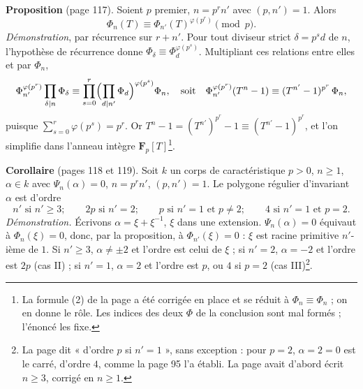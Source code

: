 \documentclass[11pt,a4paper]{article}
\begin{document}
\textbf{Proposition} (page 117). Soient $p$ premier, $n = p^r n'$ avec $(p,
n') = 1$. Alors
\[
  \Phi_n(T) \equiv \Phi_{n'}(T)^{\varphi(p^r)} \pmod p .
\]
\emph{Démonstration}, par récurrence sur $r + n'$. Pour tout diviseur strict
$\delta = p^s d$ de $n$, l'hypothèse de récurrence donne $\Phi_\delta \equiv
\Phi_d^{\varphi(p^s)}$. Multipliant ces relations entre elles et par
$\Phi_n$,
\[
  \Phi_{n'}^{\varphi(p^r)} \prod_{\delta \mid n} \Phi_\delta \equiv
  \prod_{s = 0}^{r} \Bigl(\prod_{d \mid n'} \Phi_d\Bigr)^{\varphi(p^s)}
  \Phi_n , \quad\text{soit}\quad
  \Phi_{n'}^{\varphi(p^r)} (T^n - 1) \equiv (T^{n'} - 1)^{p^r}\, \Phi_n ,
\]
puisque $\sum_{s=0}^{r} \varphi(p^s) = p^r$. Or $T^n - 1 = (T^{n'})^{p^r} -
1 \equiv (T^{n'} - 1)^{p^r}$, et l'on simplifie dans l'anneau intègre
$\mathbf{F}_p[T]$\footnote{La formule (2) de la page a été corrigée en place et
se réduit à $\Phi_n \equiv \Phi_n$ ; on en donne le rôle. Les indices des deux
$\Phi$ de la conclusion sont mal formés ; l'énoncé les fixe.}.

\textbf{Corollaire} (pages 118 et 119). Soit $k$ un corps de caractéristique
$p > 0$, $n \geq 1$, $\alpha \in k$ avec $\Psi_n(\alpha) = 0$, $n = p^r n'$,
$(p, n') = 1$. Le polygone régulier d'invariant $\alpha$ est d'ordre
\[
  n' \text{ si } n' \geq 3 ; \qquad 2p \text{ si } n' = 2 ; \qquad p \text{ si
  } n' = 1 \text{ et } p \neq 2 ; \qquad 4 \text{ si } n' = 1 \text{ et } p = 2 .
\]
\emph{Démonstration.} Écrivons $\alpha = \xi + \xi^{-1}$, $\xi$ dans une
extension. $\Psi_n(\alpha) = 0$ équivaut à $\Phi_n(\xi) = 0$, donc, par la
proposition, à $\Phi_{n'}(\xi) = 0$ : $\xi$ est racine primitive $n'$-ième de
$1$. Si $n' \geq 3$, $\alpha \neq \pm 2$ et l'ordre est celui de $\xi$ ; si
$n' = 2$, $\alpha = -2$ et l'ordre est $2p$ (cas II) ; si $n' = 1$, $\alpha =
2$ et l'ordre est $p$, ou $4$ si $p = 2$ (cas III)\footnote{La page dit
« d'ordre $p$ si $n' = 1$ », sans exception : pour $p = 2$, $\alpha = 2 = 0$
est le carré, d'ordre $4$, comme la page 95 l'a établi. La page avait d'abord
écrit $n \geq 3$, corrigé en $n \geq 1$.}.
\end{document}
